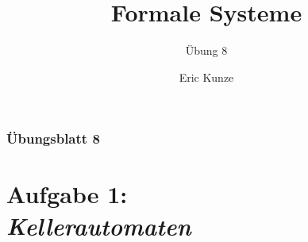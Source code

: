 \documentclass{beamer}
\begin{document}
	
	\title{Formale Systeme}
	\subtitle{Übung 8}
	\author{Eric Kunze}
	\date{}

	\maketitle

%	

	\begin{frame} \frametitle{Übungsblatt 8}
		\tableofcontents
	\end{frame}

	\section{Aufgabe 1: \\ \itshape Kellerautomaten}

	\newcommand{\colstackrel}[3]{\,{\stackrel{\textcolor{#3}{#1}}{\textcolor{#3}{#2}}}\,}
	\newcommand{\gstackrel}[2]{\colstackrel{#1}{#2}{darkgreen}}
	\newcommand{\bstackrel}[2]{\colstackrel{#1}{#2}{darkblue}}
	\newcommand{\rstackrel}[2]{\colstackrel{#1}{#2}{darkred}}
	
\end{document}
